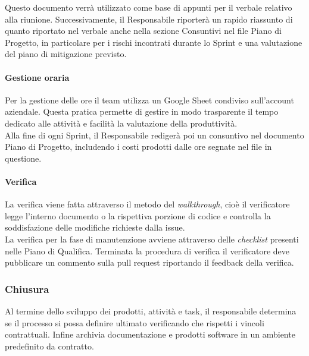         \noindent
        Questo documento verrà utilizzato come base di appunti per il verbale relativo alla riunione.
        Successivamente, il Responsabile riporterà un rapido riassunto di quanto riportato nel verbale anche nella sezione Consuntivi nel file Piano di Progetto, in particolare per i rischi incontrati durante lo Sprint e una valutazione del piano di mitigazione previsto.

        \paragraph{Gestione oraria}
        Per la gestione delle ore il team utilizza un Google Sheet condiviso sull'account aziendale. Questa pratica permette di gestire in modo trasparente il tempo dedicato alle attività e facilità la valutazione della produttività.\\
        Alla fine di ogni Sprint, il Responsabile redigerà poi un consuntivo nel documento Piano di Progetto, includendo i costi prodotti dalle ore segnate nel file in questione.

        \paragraph{Verifica} \label{sec:pian-verifica}
        La verifica viene fatta attraverso il metodo del \emph{walkthrough}, cioè il verificatore legge l'interno documento o la rispettiva porzione di codice e controlla la soddisfazione delle modifiche richieste dalla issue.\\
        La verifica per la fase di manutenzione avviene attraverso delle \emph{checklist} presenti nelle Piano di Qualifica. Terminata la procedura di verifica il verificatore deve pubblicare un commento sulla pull request riportando il feedback della verifica.
            
    \subsubsection{Chiusura}\label{sec:closure}
        Al termine dello sviluppo dei prodotti, attivit\`a e task, il responsabile determina se il processo si possa definire ultimato verificando che rispetti i vincoli contrattuali. Infine archivia documentazione e prodotti software in un ambiente predefinito da contratto.
        
        